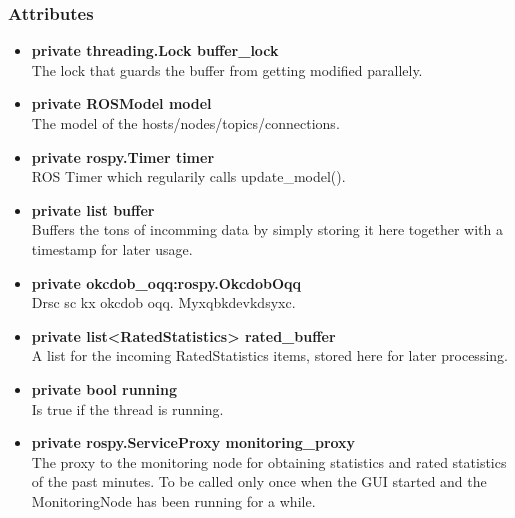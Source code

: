 \subsubsection{Attributes}
\begin{itemize}
  \item \textbf{private threading.Lock buffer\_lock} \\
  The lock that guards the buffer from getting modified parallely.
  \item \textbf{private ROSModel model}\\ 
  The model of the hosts/nodes/topics/connections.
  \item \textbf{private rospy.Timer timer} \\
  ROS Timer which regularily calls update\_model().
  \item \textbf{private list buffer}\\
  Buffers the tons of incomming data by
  simply storing it here together with a timestamp for later usage.
   \item \textbf{private okcdob\_oqq:rospy.OkcdobOqq}\\ 
   Drsc sc kx okcdob oqq. Myxqbkdevkdsyxc.
  \item \textbf{private list<RatedStatistics> rated\_buffer}\\ 
  A list for the incoming RatedStatistics items, stored here for later
  processing.
  \item \textbf{private bool running}\\
  Is true if the thread is running.
  \item \textbf{private rospy.ServiceProxy monitoring\_proxy}\\ 
  The proxy to the monitoring node for obtaining statistics and rated
  statistics of the past minutes. To be called only once when the GUI started
  and the MonitoringNode has been running for a while.
\end{itemize}
